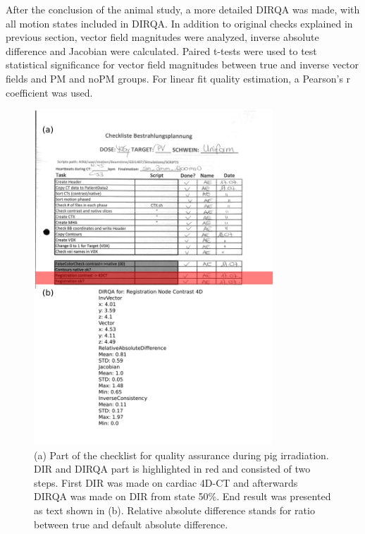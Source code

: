 \documentclass[type=dr, dr=rernat, accentcolor=tud7b,colorbacktitle, bigchapter, openright, twoside, 12pt ]{tudthesis}
\begin{document}
After the conclusion of the animal study, a more detailed DIRQA was made, with all motion states included in DIRQA. In addition to original checks explained in previous section, vector field magnitudes were analyzed, inverse absolute difference
and Jacobian were calculated. Paired t-tests were used to test statistical significance for vector field magnitudes between true and inverse vector fields and PM and noPM groups. For linear fit quality estimation, 
a Pearson's r coefficient was used.

\newpage
\begin{figure}[H]
	\begin{center}		
		\includegraphics[width=0.8\textwidth]{./Images/checkList.png}
		\caption{(a) Part of the checklist for quality assurance during pig irradiation. DIR and DIRQA part is highlighted in red and consisted of two steps. First DIR was made on cardiac 4D-CT and afterwards DIRQA was made on
		DIR from state 50\%. End result was presented as text shown in (b). Relative absolute difference stands for ratio between true and default absolute difference.}
		\label{checkList}
	\end{center}
\end{figure}
\newpage
\end{document}
